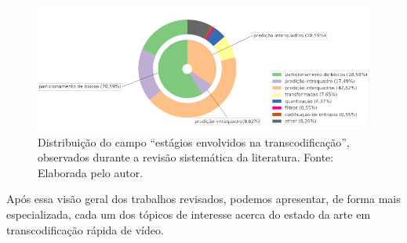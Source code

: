\begin{figure}
    \centering
    \includegraphics[width=\textwidth]{FIGURES/fig_11.png}
    \caption{Distribuição do campo ``estágios envolvidos na transcodificação'', observados durante a revisão sistemática da literatura. Fonte: Elaborada pelo autor.}
    \label{fig:11}
\end{figure}

Após essa visão geral dos trabalhos revisados, podemos apresentar, de forma mais especializada, cada um dos tópicos de interesse acerca do estado da arte em transcodificação rápida de vídeo.





